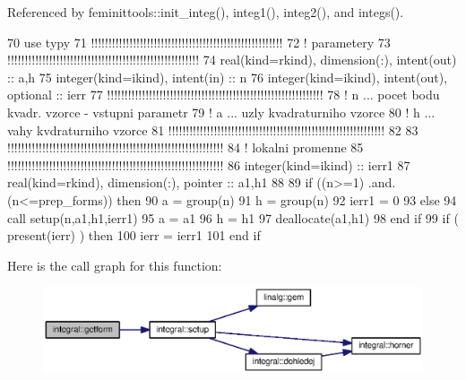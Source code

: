 Referenced by feminittools\+::init\+\_\+integ(), integ1(), integ2(), and integs().


\begin{DoxyCode}
70       \textcolor{keywordtype}{use }typy
71       \textcolor{comment}{!!!!!!!!!!!!!!!!!!!!!!!!!!!!!!!!!!!!!!!!!!!!!!!!!!!!!!!
}
72       \textcolor{comment}{!   parametery 
}
73       \textcolor{comment}{!!!!!!!!!!!!!!!!!!!!!!!!!!!!!!!!!!!!!!!!!!!!!!!!!!!!!!!
}
74       \textcolor{keywordtype}{real(kind=rkind)}, \textcolor{keywordtype}{dimension(:)}, \textcolor{keywordtype}{intent(out)} :: a,h
75       \textcolor{keywordtype}{integer(kind=ikind)}, \textcolor{keywordtype}{intent(in)} :: n
76       \textcolor{keywordtype}{integer(kind=ikind)}, \textcolor{keywordtype}{intent(out)}, \textcolor{keywordtype}{optional} :: ierr
77       \textcolor{comment}{!!!!!!!!!!!!!!!!!!!!!!!!!!!!!!!!!!!!!!!!!!!!!!!!!!!!!!!!!!!!!! 
}
78       \textcolor{comment}{! n ... pocet bodu kvadr. vzorce - vstupni parametr 
}
79       \textcolor{comment}{! a ... uzly kvadraturniho vzorce
}
80       \textcolor{comment}{! h ... vahy kvdraturniho vzorce
}
81       \textcolor{comment}{!!!!!!!!!!!!!!!!!!!!!!!!!!!!!!!!!!!!!!!!!!!!!!!!!!!!!!!!!!!!!!
}
82       
83       \textcolor{comment}{!!!!!!!!!!!!!!!!!!!!!!!!!!!!!!!!!!!!!!!!!!!!!!!!!!!!!!!!!!!!!!
}
84       \textcolor{comment}{! lokalni promenne
}
85       \textcolor{comment}{!!!!!!!!!!!!!!!!!!!!!!!!!!!!!!!!!!!!!!!!!!!!!!!!!!!!!!!!!!!!!!
}
86       \textcolor{keywordtype}{integer(kind=ikind)} :: ierr1
87       \textcolor{keywordtype}{real(kind=rkind)}, \textcolor{keywordtype}{dimension(:)}, \textcolor{keywordtype}{pointer} :: a1,h1
88       
89       \textcolor{keywordflow}{if} ((n>=1) .and. (n<=prep_forms)) then
90         a = group(n)%
91         h = group(n)%
92         ierr1 = 0
93       else
94         \textcolor{keyword}{call }setup(n,a1,h1,ierr1)
95         a = a1
96         h = h1
97         \textcolor{keyword}{deallocate}(a1,h1)
98 \textcolor{keywordflow}{      end if}            
99       \textcolor{keywordflow}{if} ( \textcolor{keyword}{present}(ierr) ) then
100         ierr = ierr1
101 \textcolor{keyword}{      end }if
\end{DoxyCode}


Here is the call graph for this function\+:\nopagebreak
\begin{figure}[H]
\begin{center}
\leavevmode
\includegraphics[width=350pt]{namespaceintegral_a0201981d5a57be0c8ce2d83b2307f2ee_cgraph}
\end{center}
\end{figure}




